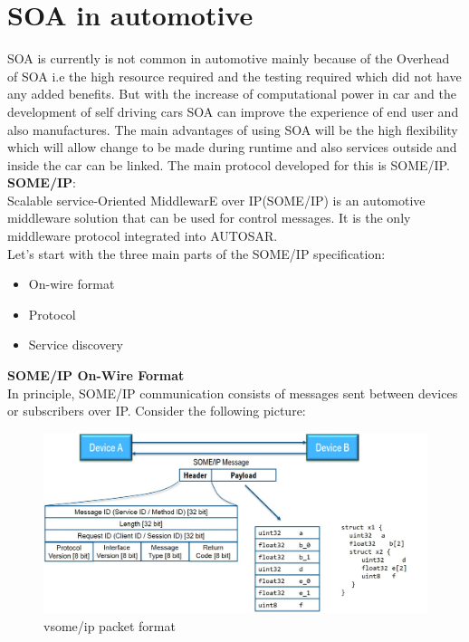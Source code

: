\documentclass{fisattraining}
\begin{document}
\section{SOA in automotive}
SOA is currently is not common in automotive mainly because of the Overhead of SOA i.e the high resource required and the testing required which did not have any added benefits. But with the increase of computational power in car and the development of self driving cars SOA can improve the experience of end user and also manufactures. The main advantages of using SOA will be the high flexibility which will allow change to be made during runtime and also services outside and inside the car can be linked. The main protocol developed for this is SOME/IP.\\
\textbf{SOME/IP}:\\
Scalable service-Oriented MiddlewarE over IP(SOME/IP) is an automotive middleware solution that can be used for control messages. It is the only middleware protocol integrated into AUTOSAR.\\
Let's start with the three main parts of the SOME/IP specification:
\begin{itemize}
\item On-wire format
\item Protocol
\item Service discovery
\end{itemize}
\textbf{SOME/IP On-Wire Format}\\
In principle, SOME/IP communication consists of messages sent between devices or subscribers over IP. Consider the following picture:
\begin{figure}[h!]
\begin{center}
\includegraphics[scale=.5]{SOMEIPOnWireFormat}
\caption{vsome/ip packet format}
\end{center}
\end{figure}\\
\end{document}
